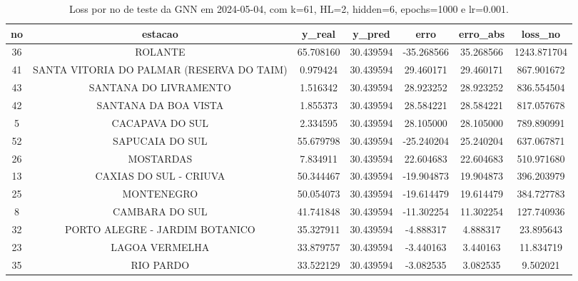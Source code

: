 \begin{table}[h]
\centering
\caption{Loss por no de teste da GNN em 2024-05-04, com k=61, HL=2, hidden=6, epochs=1000 e lr=0.001.}
\label{tab:gnn_loss_k61_hl2_h6_e1000_d20240504}
\begin{tabular}{ccccccc}
\toprule
no & estacao & y\_real & y\_pred & erro & erro\_abs & loss\_no \\
\midrule
36 & ROLANTE & 65.708160 & 30.439594 & -35.268566 & 35.268566 & 1243.871704 \\
41 & SANTA VITORIA DO PALMAR (RESERVA DO TAIM) & 0.979424 & 30.439594 & 29.460171 & 29.460171 & 867.901672 \\
43 & SANTANA DO LIVRAMENTO & 1.516342 & 30.439594 & 28.923252 & 28.923252 & 836.554504 \\
42 & SANTANA DA BOA VISTA & 1.855373 & 30.439594 & 28.584221 & 28.584221 & 817.057678 \\
5 & CACAPAVA DO SUL & 2.334595 & 30.439594 & 28.105000 & 28.105000 & 789.890991 \\
52 & SAPUCAIA DO SUL & 55.679798 & 30.439594 & -25.240204 & 25.240204 & 637.067871 \\
26 & MOSTARDAS & 7.834911 & 30.439594 & 22.604683 & 22.604683 & 510.971680 \\
13 & CAXIAS DO SUL - CRIUVA & 50.344467 & 30.439594 & -19.904873 & 19.904873 & 396.203979 \\
25 & MONTENEGRO & 50.054073 & 30.439594 & -19.614479 & 19.614479 & 384.727783 \\
8 & CAMBARA DO SUL & 41.741848 & 30.439594 & -11.302254 & 11.302254 & 127.740936 \\
32 & PORTO ALEGRE - JARDIM BOTANICO & 35.327911 & 30.439594 & -4.888317 & 4.888317 & 23.895643 \\
23 & LAGOA VERMELHA & 33.879757 & 30.439594 & -3.440163 & 3.440163 & 11.834719 \\
35 & RIO PARDO & 33.522129 & 30.439594 & -3.082535 & 3.082535 & 9.502021 \\
\bottomrule
\end{tabular}
\end{table}
